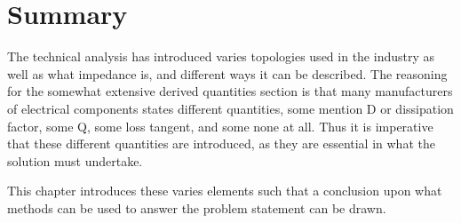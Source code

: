 \section{Summary} \label{sec:TechAnalSum}
The technical analysis has introduced varies topologies used in the industry as well as what impedance is, and different ways it can
be described. The reasoning for the somewhat extensive derived quantities section is that many manufacturers of electrical components
states different quantities, some mention D or dissipation factor, some Q, some loss tangent, and some none at all. Thus it is
imperative that these different quantities are introduced, as they are essential in what the solution must undertake.

This chapter introduces these varies elements such that a conclusion upon what methods can be used to answer the problem statement can
be drawn.